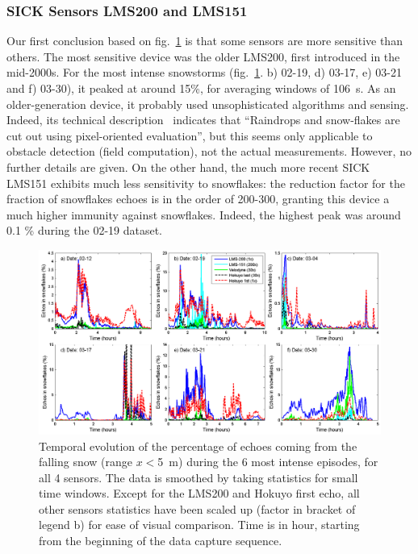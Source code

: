 \subsubsection{SICK Sensors LMS200 and LMS151}
Our first conclusion based on fig.~\ref{fig:TimingSnow} is that some sensors are more sensitive than others. The most sensitive device was the older LMS200, first introduced in the mid-2000s. For the most intense snowstorms (fig.~\ref{fig:TimingSnow}. b) 02-19, d) 03-17, e) 03-21 and f) 03-30), it peaked at around 15\%, for averaging windows of \SI{106}{\second}. As an older-generation device, it probably used unsophisticated algorithms and sensing. Indeed, its technical description~\cite{LMS200Manual} indicates that ``Raindrops and snow-flakes are cut out using pixel-oriented evaluation'', but this seems only applicable to  obstacle detection (field computation), not the actual measurements. However, no further details are given. On the other hand, the much more recent SICK LMS151 exhibits much less sensitivity to snowflakes: the reduction factor for the fraction of snowflakes echoes is in the order of 200-300, granting this device a much higher immunity against snowflakes. Indeed, the highest peak was around 0.1 \% during the 02-19 dataset. 


\begin{figure}[th]
    \centering
    \includegraphics[width=0.98\linewidth]{./img/TimingSnow.png}
    \caption{Temporal evolution of the percentage of echoes coming from the falling snow (range $x<$\SI{5}{\meter}) during the 6 most intense episodes, for all 4 sensors. The data is smoothed by taking statistics for small time windows. Except for the LMS200 and Hokuyo first echo, all other sensors statistics have been scaled up (factor in bracket of legend b) for ease of visual comparison. Time is in hour, starting from the beginning of the data capture sequence. }
    \label{fig:TimingSnow}
\end{figure}


